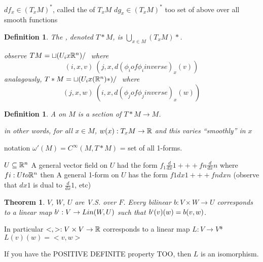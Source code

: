 \documentclass[11pt]{amsbook}
\newenvironment{dateenv}{
	\vspace{1em}
}{
	\vspace{1em}
}
\newcommand{\mydate}[4]{
	\newdate{#1}{#2}{#3}{#4}
	\begin{dateenv}
		\hfill\displaydate{#1}
	\end{dateenv}
}
\theoremstyle{mystyle} \newtheorem{thrm}[thm]{Theorem}
\theoremstyle{mystyle} \newtheorem{defi}[thm]{Definition}
\theoremstyle{mystyle} \newtheorem{coro}[thm]{Corollary}
\theoremstyle{mystyle} \newtheorem{propo}[thm]{Proposition}
\theoremstyle{mystyle} \newtheorem{lemm}[thm]{Lemma}
\numberwithin{thm}{section}
\newcommand{\x}{\times}
\begin{document}
$df_x \in (T_xM)^*$, called the  of $T_xM$
$dg_x \in (T_xM)^*$ too
set of above over all smooth functions

\begin{defi}
	The , denoted $T*M$, is
	$\bigcup_{x \in M} (T_xM)*$.


	observe
	$TM = \sqcup (U_i x {\mathbb R}^n)/~$
	where $$(i, x, v) ~ (j, x, d(\phi_i of \phi_i inverse)_x(v))$$
	analagously,
	$T*M = \sqcup (U_i x ({\mathbb R}^n)*)/~$
	where $$(j, x, w) ~ (i, x, d(\phi_j of \phi_j inverse)_x(w))$$
\end{defi}
\begin{defi}
	A  on $M$ is a section of $T*M \to M$.

	in other words, for all $x \in M$, $w(x): T_xM \to {\mathbb R}$ and this varies ``smoothly'' in $x$
\end{defi}
	notation
	$\omega'(M) = C^\infty(M, T*M)$ = set of all 1-forms.

\begin{example}
	$U \subseteq {\mathbb R}^n$
	A general vector field on $U$ had the form
	$f_1 \frac{d}{dx}1 +++ fn \frac{d}{dx}n$
	where $fi : U to {\mathbb R}^n$
	then
	A general 1-form on $U$ has the form
	$f1 dx1 +++ fn dxn$
	(observe that $dx1$ is dual to $\frac{d}{dx}1$, etc)
\end{example}

\mydate{d7}{17}{10}{2016}

\begin{thrm}
	$V$, $W$, $U$ are V.S. over $F$.  Every bilinear $b:V \x W \to U$ corresponds to a linear map $b` : V \to Lin(W,U)$
	such that $b`(v)(w) = b(v,w)$.
\end{thrm}
	In particular $<,> : V \x V \to \R$
	corresponds to a linear map
	$L: V \to V$*
	$L(v)(w) = <v,w>$

	If you have the POSITIVE DEFINITE property TOO, then $L$ is an isomorphism.
\end{document}
